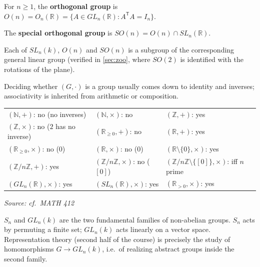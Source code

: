 \documentclass[11pt]{report}
\newcommand{\srcline}[1]{\par\hfill{\footnotesize\textit{Source: #1}}}
\begin{document}
\begin{defbox}\label{def:orthogonal-group}
For $n \geq 1$, the \textbf{orthogonal group} is $O(n) = O_n(\mathbb{R}) = \{A \in GL_n(\mathbb{R}) : A^{\mathsf{T}}A = I_n\}$.
\end{defbox}

\begin{defbox}\label{def:special-orthogonal-group}
The \textbf{special orthogonal group} is $SO(n) = O(n) \cap SL_n(\mathbb{R})$.
\end{defbox}

Each of $SL_n(k)$, $O(n)$ and $SO(n)$ is a subgroup of the corresponding general linear group (verified in \ref{sec:zoo}, where $SO(2)$ is identified with the rotations of the plane).

\begin{exbox}\label{ex:groups-non-groups}
Deciding whether $(G, \cdot)$ is a group usually comes down to identity and inverses; associativity is inherited from arithmetic or composition.
\begin{center}
\begin{tabular}{lll}
$(\mathbb{N}, +)$: no (no inverses) & $(\mathbb{N}, \times)$: no & $(\mathbb{Z}, +)$: yes \\
$(\mathbb{Z}, \times)$: no ($2$ has no inverse) & $(\mathbb{R}_{\geq 0}, +)$: no & $(\mathbb{R}, +)$: yes \\
$(\mathbb{R}_{\geq 0}, \times)$: no ($0$) & $(\mathbb{R}, \times)$: no ($0$) & $(\mathbb{R}\setminus\{0\}, \times)$: yes \\
$(\mathbb{Z}/n\mathbb{Z}, +)$: yes & $(\mathbb{Z}/n\mathbb{Z}, \times)$: no ($[0]$) & $(\mathbb{Z}/n\mathbb{Z} \setminus \{[0]\}, \times)$: iff $n$ prime \\
$(GL_n(\mathbb{R}), \times)$: yes & $(SL_n(\mathbb{R}), \times)$: yes & $(\mathbb{R}_{>0}, \times)$: yes
\end{tabular}
\end{center}
\srcline{cf.\ MATH 412}
\end{exbox}

\begin{rembox}[{$S_n$ and $GL_n(k)$}]\label{rem:sn-gln-k}
$S_n$ and $GL_n(k)$ are the two fundamental families of non-abelian groups. $S_n$ acts by permuting a finite set; $GL_n(k)$ acts linearly on a vector space. Representation theory (second half of the course) is precisely the study of homomorphisms $G \to GL_n(k)$, i.e.\ of realizing abstract groups inside the second family.
\end{rembox}
\end{document}
